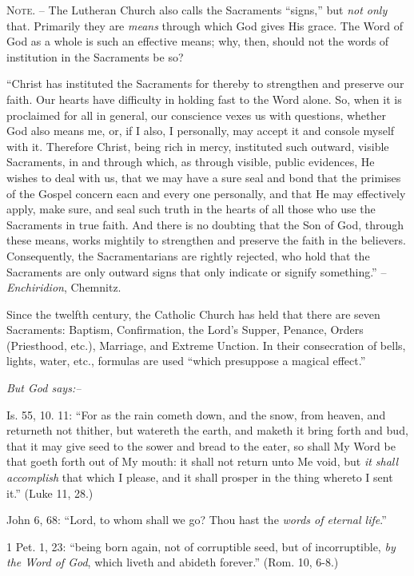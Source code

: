 \documentclass[
]{book}
\begin{document}
\textsc{Note. --} The Lutheran Church also calls the Sacraments ``signs,'' but \emph{not only} that. Primarily they are \emph{means} through which God gives His grace. The Word of God as a whole is such an effective means; why, then, should not the words of institution in the Sacraments be so?

``Christ has instituted the Sacraments for thereby to strengthen and preserve our faith. Our hearts have difficulty in holding fast to the Word alone. So, when it is proclaimed for all in general, our conscience vexes us with questions, whether God also means me, or, if I also, I personally, may accept it and console myself with it. Therefore Christ, being rich in mercy, instituted such outward, visible Sacraments, in and through which, as through visible, public evidences, He wishes to deal with us, that we may have a sure seal and bond that the primises of the Gospel concern eacn and every one personally, and that He may effectively apply, make sure, and seal such truth in the hearts of all those who use the Sacraments in true faith. And there is no doubting that the Son of God, through these means, works mightily to strengthen and preserve the faith in the believers. Consequently, the Sacramentarians are rightly rejected, who hold that the Sacraments are only outward signs that only indicate or signify something.'' -- \emph{Enchiridion}, Chemnitz.

Since the twelfth century, the Catholic Church has held that there are seven Sacraments: Baptism, Confirmation, the Lord's Supper, Penance, Orders (Priesthood, etc.), Marriage, and Extreme Unction. In their consecration of bells, lights, water, etc., formulas are used ``which presuppose a magical effect.''

\begin{center}
\textsl{But God says:--}
\end{center}

Is. 55, 10. 11: ``For as the rain cometh down, and the snow, from heaven, and returneth not thither, but watereth the earth, and maketh it bring forth and bud, that it may give seed to the sower and bread to the eater, so shall My Word be that goeth forth out of My mouth: it shall not return unto Me void, but \emph{it shall accomplish} that which I please, and it shall prosper in the thing whereto I sent it.'' (Luke 11, 28.)

John 6, 68: ``Lord, to whom shall we go? Thou hast the \emph{words of eternal life}.''

1 Pet. 1, 23: ``being born again, not of corruptible seed, but of incorruptible, \emph{by the Word of God}, which liveth and abideth forever.'' (Rom. 10, 6-8.)
\end{document}
